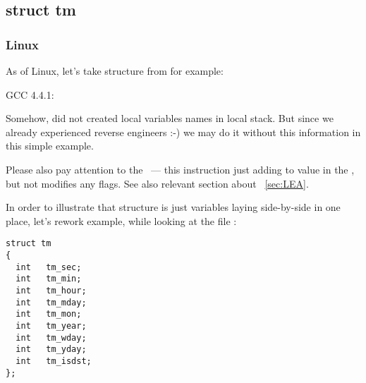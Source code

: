 \subsection{struct tm}

\subsubsection{Linux}

{As of Linux, let's take  structure from  for example:}



 GCC 4.4.1:

\IFRU{}{}

{Somehow, \IDA did not created local variables names in local stack.
But since we already experienced reverse engineers :-) we may do it without this information in 
this simple example.}

{Please also pay attention to the  ~--- this instruction just adding  to value in the \EAX,
but not modifies any flags. See also relevant section about \LEA{}~\ref{sec:LEA}.}

{In order to illustrate that structure is just variables laying side-by-side in one place, let's rework
example, while looking at the file} :

\begin{lstlisting}[caption=time.h]
struct tm
{
  int	tm_sec;
  int	tm_min;
  int	tm_hour;
  int	tm_mday;
  int	tm_mon;
  int	tm_year;
  int	tm_wday;
  int	tm_yday;
  int	tm_isdst;
};
\end{lstlisting}



